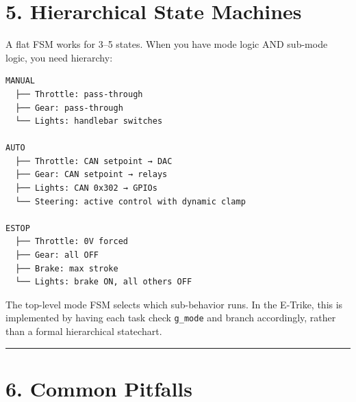 \documentclass[12pt,a4paper,oneside]{report}
\begin{document}
\section{5. Hierarchical State Machines}\label{hierarchical-state-machines}

A flat FSM works for 3--5 states. When you have mode logic AND sub-mode logic,
you need hierarchy:

\begin{verbatim}
MANUAL
  ├── Throttle: pass-through
  ├── Gear: pass-through
  └── Lights: handlebar switches

AUTO
  ├── Throttle: CAN setpoint → DAC
  ├── Gear: CAN setpoint → relays
  ├── Lights: CAN 0x302 → GPIOs
  └── Steering: active control with dynamic clamp

ESTOP
  ├── Throttle: 0V forced
  ├── Gear: all OFF
  ├── Brake: max stroke
  └── Lights: brake ON, all others OFF
\end{verbatim}

The top-level mode FSM selects which sub-behavior runs. In the E-Trike, this is
implemented by having each task check \texttt{g\_mode} and branch accordingly,
rather than a formal hierarchical statechart.

\begin{center}\rule{0.5\linewidth}{0.5pt}\end{center}

\section{6. Common Pitfalls}\label{common-pitfalls}
\end{document}
